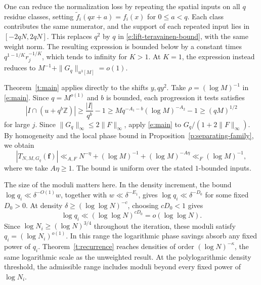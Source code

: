 \documentclass[12pt]{amsart}
\newcommand{\1}{\mathbf 1}
\theoremstyle{definition}
\begin{document}
One can reduce the normalization loss by repeating the spatial
inputs on all \(q\) residue classes, setting
\(\widetilde f_i(qx+a)=f_i(x)\) for \(0\leq a<q\).
Each class contributes the same numerator, and the support
of each repeated input lies in \([-2qN,2qN]\).
This replaces \(q^2\) by \(q\) in
\eqref{e:lift-teravainen-bound}, with the same weight norm.
The resulting expression is bounded below by a constant
times \(q^{1-1/K}r_j^{-1/K}\), which tends to infinity for
\(K>1\). At \(K=1\), the expression instead reduces to
\(M^{-1}+\|G_q\|_{u^3[M]}=o(1)\).

Theorem~\ref{t:main} applies directly to the shifts \(y,qy^2\).
Take \(\rho=(\log M)^{-1}\) in \eqref{e:main}. Since
\(q=M^{o(1)}\) and \(b\) is bounded, each progression it tests
satisfies
\[
 |I\cap(u+q^b\mathbb Z)|
 \geq \frac{|I|}{q^b}-1
 \geq Mq^{-A_1-b}(\log M)^{-A_2}-1
 \geq(qM)^{1/2}
\]
for large \(j\). Since $\|G_q\|_\infty\leq2\|F\|_\infty$, apply \eqref{e:main}
to $G_q/(1+2\|F\|_\infty)$. By homogeneity and the local phase
bound in Proposition~\ref{p:separating-family}, we obtain
\[
 |T_{N,M,G_q}(\mathbf f)|
 \ll_{A,F} N^{-\eta}+(\log M)^{-1}+(\log M)^{-A\eta}
 \ll_F (\log M)^{-1},
\]
where we take \(A\eta\geq1\). The bound is uniform over the
stated \(1\)-bounded inputs.


The size of the moduli matters here. In the density increment,
the bound \(\log q_i\ll\delta^{-O(1)}w\), together with
\(w\ll\delta^{-E_1}\), gives \(\log q_i\ll\delta^{-D_0}\) for
some fixed \(D_0>0\). At density
\(\delta\geq(\log\log N)^{-c}\), choosing \(cD_0<1\) gives
\[
 \log q_i\ll(\log\log N)^{cD_0}=o(\log\log N).
\]
Since \(\log N_i\geq(\log N)^{3/4}\) throughout the iteration,
these moduli satisfy \(q_i=(\log N_i)^{o(1)}\). In this range
the logarithmic phase savings absorb any fixed power of \(q_i\).
Theorem~\ref{t:recurrence} reaches densities of order
\((\log N)^{-\kappa}\), the same logarithmic scale as the
unweighted result. 
At the polylogarithmic density threshold, the admissible range
includes moduli beyond every fixed power of $\log N_i$.
\end{document}
